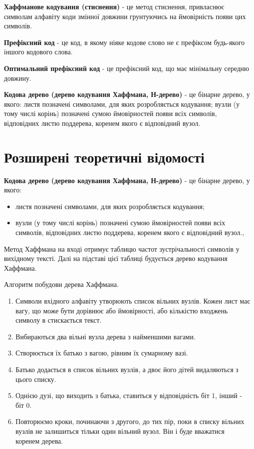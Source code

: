 \textbf{Хаффманове кодування (стиснення)} - це метод стиснення, привласнює символам алфавіту коди змінної довжини грунтуючись на ймовірність появи цих символів.

\textbf{Префіксний код} - це код, в якому ніяке кодове слово не є префіксом будь-якого іншого кодового слова.

\textbf{Оптимальний префіксний код} - це префіксний код, що має мінімальну середню довжину.

\textbf{Кодова дерево (дерево кодування Хаффмана, Н-дерево)} - це бінарне дерево, у якого: листя позначені символами, для яких розробляється кодування; вузли (у тому числі корінь) позначені сумою ймовірностей появи всіх символів, відповідних листю поддерева, коренем якого є відповідний вузол.

\section{Розширені теоретичні відомості}
\nopagebreak[4]

\textbf{Кодова дерево (дерево кодування Хаффмана, Н-дерево)} - це бінарне дерево, у якого:

\begin{itemize}
\item листя позначені символами, для яких розробляється кодування;
\item вузли (у тому числі корінь) позначені сумою ймовірностей появи всіх символів, відповідних листю поддерева, коренем якого є відповідний вузол.,
\end{itemize}

Метод Хаффмана на вході отримує таблицю частот зустрічальності символів у вихідному тексті. Далі на підставі цієї таблиці будується дерево кодування Хаффмана.

Алгоритм побудови дерева Хаффмана.

\begin{enumerate}


\item Символи вхідного алфавіту утворюють список вільних вузлів. Кожен лист має вагу, що може бути дорівнює або ймовірності, або кількістю входжень символу в стискається текст.

\item Вибираються два вільні вузла дерева з найменшими вагами.

\item Створюється їх батько з вагою, рівним їх сумарному вазі.

\item Батько додається в список вільних вузлів, а двоє його дітей видаляються з цього списку.

\item Однією дузі, що виходить з батька, ставиться у відповідність біт 1, інший - біт 0.

\item Повторюємо кроки, починаючи з другого, до тих пір, поки в списку вільних вузлів не залишиться тільки один вільний вузол. Він і буде вважатися коренем дерева.
\end{enumerate}

